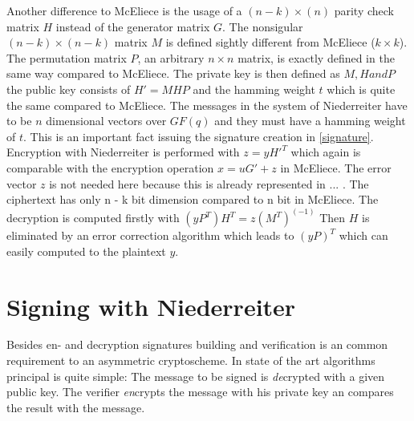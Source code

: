 Another difference to McEliece is the usage of a $(n - k) \times (n)$ parity check matrix $H$ instead of  the generator matrix $G$. %
The nonsigular $(n - k) \times (n - k)$ matrix $M$ is defined sightly different from McEliece ($k \times k$).%
The permutation matrix $P$, an arbitrary $n \times n$ matrix, is exactly defined in the same way compared to McEliece.
The private key is then defined as $M, H and P$ the public key consists of $H' = MHP$ and the hamming weight $t$ which is quite the same compared to McEliece.
The messages in the system of Niederreiter have to be $n$ dimensional vectors over $GF(q)$ and they must have a hamming weight of $t$. This is an important fact issuing the signature creation in \autoref{signature}.
Encryption with Niederreiter is performed with $z = yH'^T$ which again is comparable with the encryption operation $x = uG' + z$ in McEliece. The error vector $z$ is not needed here because this is already represented in ... . The ciphertext has only n - k bit dimension compared to n bit in McEliece. 
The decryption is computed firstly with $(yP^T)H^T = z(M^T)^(-1)$ Then $H$ is eliminated by an error correction algorithm which leads to $(yP)^T$ which can easily computed to the plaintext $y$. \cite{sendrier2011niederreiter}\cite{li1994equivalence}\cite{niederreiter1986knapsack}





\section{Signing with Niederreiter}
\label{signature}
Besides en- and decryption signatures building and verification is an common requirement to an asymmetric cryptoscheme. In state of the art algorithms principal is quite simple: The message to be signed is \textit{de}crypted with a given public key. The verifier \textit{en}crypts the message with his private key an compares the result with the message. 

